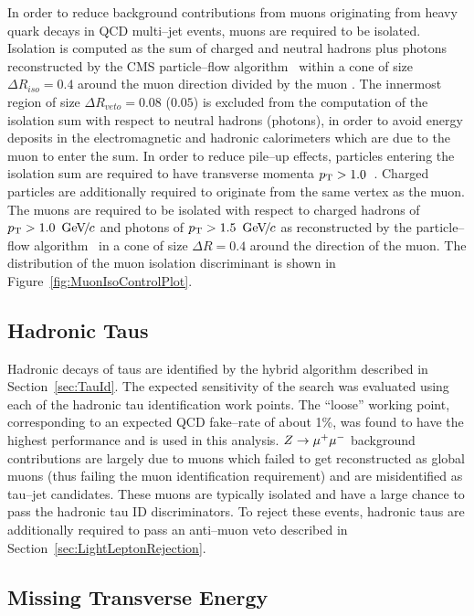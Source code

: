 In order to reduce background contributions from muons originating from heavy
quark decays in QCD multi--jet events, muons are required to be isolated.
Isolation is computed as the \pt sum of charged and neutral hadrons plus photons
reconstructed by the CMS particle--flow algorithm~\cite{CMS-PAS-PFT-09-001}
within a cone of size $\Delta R_{iso} = 0.4$ around the muon direction divided
by the muon \pt.  The
innermost region of size $\Delta R_{veto} = 0.08$ ($0.05$) is excluded from the
computation of the isolation \pt sum with respect to neutral hadrons (photons),
in order to avoid energy deposits in the electromagnetic and hadronic
calorimeters which are due to the muon to enter the sum.  In order to reduce
pile--up effects, particles entering the isolation \pt sum are required to have
transverse momenta $p_{\mathrm{T}} > 1.0$~\GeVc.  Charged particles are additionally
required to originate from the same vertex as the muon.  The muons are required
to be isolated with respect to charged hadrons of $p_{\mathrm{T}} > 1.0~{\,\text{Ge\hspace{-.08em}V\hspace{-0.16em}/\hspace{-0.08em}}c}$ and photons
of $p_{\mathrm{T}} > 1.5~{\,\text{Ge\hspace{-.08em}V\hspace{-0.16em}/\hspace{-0.08em}}c}$ as reconstructed by the particle--flow
algorithm~\cite{CMS-PAS-PFT-09-001} in a cone of size $\Delta R = 0.4$ around
the direction of the muon.  The distribution of the muon isolation discriminant
is shown in Figure~\ref{fig:MuonIsoControlPlot}.

\subsection{Hadronic Taus}

Hadronic decays of taus are identified by the \hpsTanc hybrid algorithm
described in Section~\ref{sec:TauId}.  The expected sensitivity of the search
was evaluated using each of the hadronic tau identification work points.  The
``loose'' working point, corresponding to an expected QCD fake--rate of about
1\%, was found to have the highest performance and is used in this analysis.  $Z
\to \mu^+\mu^-$ background contributions are largely due to muons which failed to get
reconstructed as global muons (thus failing the muon identification requirement)
and are misidentified as tau--jet candidates.  These muons are typically
isolated and have a large chance to pass the hadronic tau ID discriminators.  To
reject these events, hadronic taus are additionally required to pass an
anti--muon veto described in Section~\ref{sec:LightLeptonRejection}. 

\subsection{Missing Transverse Energy}

